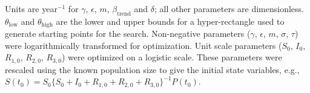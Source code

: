 \documentclass[11pt]{article}
\begin{document}
\begin{table}
\begin{center}
{{Units are year$^{-1}$ for $\gamma$, $\epsilon$, $m$, $\beta_{\mathrm{trend}}$ and $\delta$;  all other parameters are dimensionless.
$\theta_\mathrm{low}$ and $\theta_\mathrm{high}$ are the lower and upper bounds for a hyper-rectangle used to generate starting points for the search.
Non-negative parameters ($\gamma$, $\epsilon$, $m$, $\sigma$, $\tau$) were logarithmically transformed for optimization.
Unit scale parameters ($S_0$, $I_0$, $R_{1,0}$, $R_{2,0}$,  $R_{3,0}$) were optimized on a logistic scale. 
These parameters were rescaled using the known population size to give the initial state variables, e.g., $S(t_0)=S_0\{ S_0+I_0+R_{1,0}+R_{2,0}+R_{3,0}\}^{-1} P(t_0)$.}
} 
\end{center}
\end{table}
\end{document}
